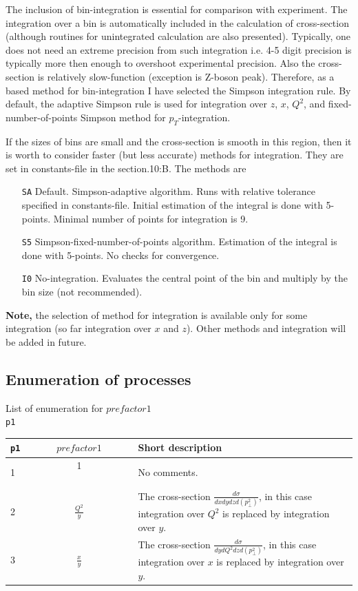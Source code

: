 \documentclass[prd,nofootinbib,eqsecnum,final]{revtex4}
\renewcommand{\(}{\left(}
\renewcommand{\)}{\right)}
\renewcommand{\[}{\left[}
\renewcommand{\]}{\right]}
\begin{document}
The inclusion of bin-integration is essential for comparison with experiment. The integration over a bin is automatically included in the calculation of cross-section (although routines for unintegrated calculation are also presented). Typically, one does not need an extreme precision from such integration i.e. 4-5 digit precision is typically more then enough to overshoot experimental precision. Also the cross-section is relatively slow-function (exception is Z-boson peak). Therefore, as a based method for bin-integration I have selected the Simpson integration rule. By default, the adaptive Simpson rule is used for integration over $z$, $x$, $Q^2$, and fixed-number-of-points Simpson method for $p_T$-integration.

If the sizes of bins are small and the cross-section is smooth in this region, then it is worth to consider faster (but less accurate) methods for integration. They are set in constants-file in the section.10:B. The methods are
\begin{itemize}
\item[\texttt{SA}] Default. Simpson-adaptive algorithm. Runs with relative tolerance specified in constants-file. Initial estimation of the integral is done with 5-points. Minimal number of points for integration is 9.
\item[\texttt{S5}] Simpson-fixed-number-of-points algorithm. Estimation of the integral is done with 5-points. No checks for convergence.
\item[\texttt{I0}] No-integration. Evaluates the central point of the bin and multiply by the bin size (not recommended).
\end{itemize}

\textbf{Note,} the selection of method for integration is available only for some integration (so far integration over $x$ and $z$). Other methods and integration will be added in future.


\subsection{Enumeration of processes}

\begin{center}
List of enumeration for $prefactor1$
\\
\texttt{p1}
\\
\begin{tabular}{||l|c||p{12cm}||}
\hline\hline
\texttt{p1} & ~~$prefactor1$~~&  Short description 
\\\hline
1 & 1$\qquad\qquad\qquad\qquad\qquad$ & No comments.
\\\hline
2 & $\frac{Q^2}{y}$& The cross-section $\frac{d\sigma}{dx dy dz d(p_\perp^2)}$, in this case integration over $Q^2$ is replaced by integration over $y$.
\\\hline
3 & $\frac{x}{y}$ & The cross-section $\frac{d\sigma}{dy dQ^2 dz d(p_\perp^2)}$, in this case integration over $x$ is replaced by integration over $y$.
\\\hline\hline
\end{tabular}
\end{center}
\end{document}
